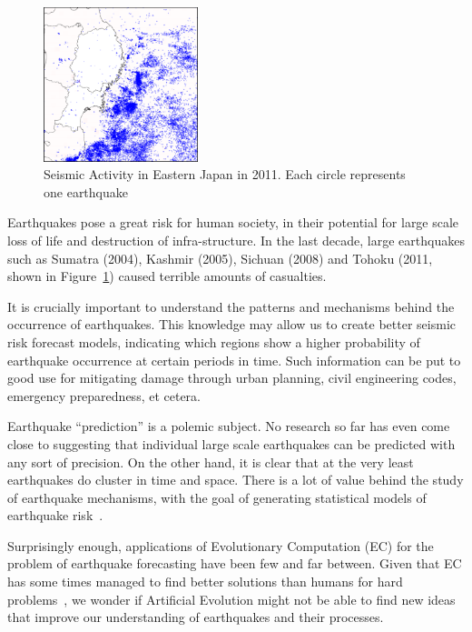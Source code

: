 \documentclass[a4paper,twoside]{article}
\begin{document}
\begin{figure}
  \begin{center}
    \includegraphics[width=0.4\textwidth]{img/tohokuoki.png}
  \end{center}
  \caption{Seismic Activity in Eastern Japan in 2011. Each circle
    represents one earthquake}
  \label{touhokuoki}
\end{figure}

Earthquakes pose a great risk for human society, in their potential
for large scale loss of life and destruction of infra-structure. In
the last decade, large earthquakes such as Sumatra (2004), Kashmir
(2005), Sichuan (2008) and Tohoku (2011, shown in
Figure~\ref{touhokuoki}) caused terrible amounts of casualties.

It is crucially important to understand the patterns and mechanisms
behind the occurrence of earthquakes. This knowledge may allow us to
create better seismic risk forecast models, indicating which regions
show a higher probability of earthquake occurrence at certain periods
in time. Such information can be put to good use for mitigating damage
through urban planning, civil engineering codes, emergency
preparedness, et cetera.

Earthquake ``prediction'' is a polemic subject. No research so far has
even come close to suggesting that individual large scale earthquakes
can be predicted with any sort of precision. On the other hand, it is
clear that at the very least earthquakes do cluster in time and
space. There is a lot of value behind the study of earthquake
mechanisms, with the goal of generating statistical models of
earthquake risk~\cite{Nature1999}.

Surprisingly enough, applications of Evolutionary Computation (EC) for
the problem of earthquake forecasting have been few and far
between. Given that EC has some times managed to find better solutions
than humans for hard problems~\cite{Koza2003}, we wonder if Artificial
Evolution might not be able to find new ideas that improve our
understanding of earthquakes and their processes.
\end{document}
